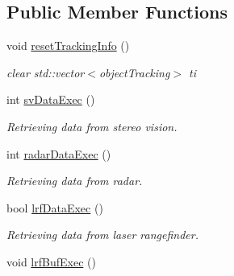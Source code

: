 \subsection*{Public Member Functions}
\begin{DoxyCompactItemize}
\item 
\hypertarget{class_sensor_info_a5cf4cd38a1a4779612aa15b78a516b20}{}void \hyperlink{class_sensor_info_a5cf4cd38a1a4779612aa15b78a516b20}{reset\+Tracking\+Info} ()\label{class_sensor_info_a5cf4cd38a1a4779612aa15b78a516b20}

\begin{DoxyCompactList}\small\item\em clear std\+::vector$<$object\+Tracking$>$ ti \end{DoxyCompactList}\item 
int \hyperlink{class_sensor_info_ad3aceaec34ba17e59bebc8c37679e4d7}{sv\+Data\+Exec} ()
\begin{DoxyCompactList}\small\item\em Retrieving data from stereo vision. \end{DoxyCompactList}\item 
int \hyperlink{class_sensor_info_aba48141526605d2b9a39585b1221293d}{radar\+Data\+Exec} ()
\begin{DoxyCompactList}\small\item\em Retrieving data from radar. \end{DoxyCompactList}\item 
bool \hyperlink{class_sensor_info_abc177db051acc8cec5e06261042baa3a}{lrf\+Data\+Exec} ()
\begin{DoxyCompactList}\small\item\em Retrieving data from laser rangefinder. \end{DoxyCompactList}\item 
\hypertarget{class_sensor_info_a7ad4246a8f17cee7e95dc9e3f2762e15}{}void \hyperlink{class_sensor_info_a7ad4246a8f17cee7e95dc9e3f2762e15}{lrf\+Buf\+Exec} ()\label{class_sensor_info_a7ad4246a8f17cee7e95dc9e3f2762e15}


\end{DoxyCompactItemize}
